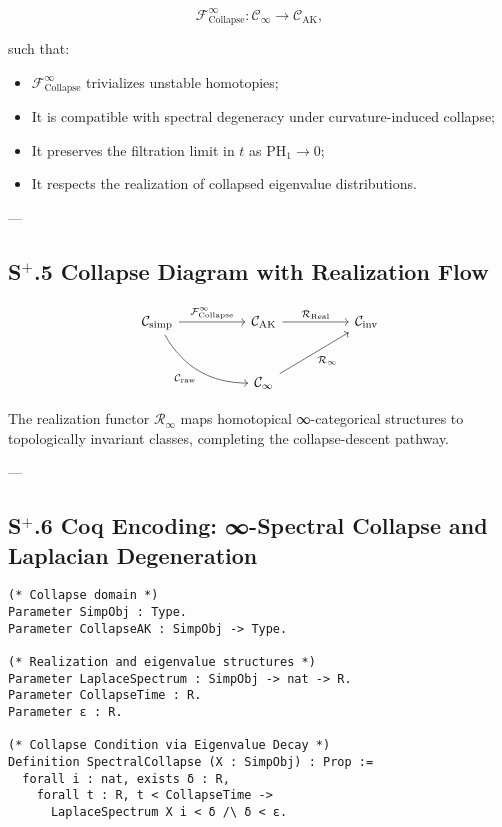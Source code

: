 \documentclass[11pt]{article}
\begin{document}
\[
\mathcal{F}_{\mathrm{Collapse}}^\infty : \mathcal{C}_\infty \to \mathcal{C}_{\mathrm{AK}},
\]

such that:

\begin{itemize}
    \item $\mathcal{F}_{\mathrm{Collapse}}^\infty$ trivializes unstable homotopies;
    \item It is compatible with spectral degeneracy under curvature-induced collapse;
    \item It preserves the filtration limit in \( t \) as \( \mathrm{PH}_1 \to 0 \);
    \item It respects the realization of collapsed eigenvalue distributions.
\end{itemize}

---

\subsection*{S$^{+}$.5 Collapse Diagram with Realization Flow}

\[
\begin{tikzcd}[column sep=huge, row sep=large]
\mathcal{C}_{\mathrm{simp}} 
  \arrow[r, "\mathcal{F}_{\mathrm{Collapse}}^\infty"] 
  \arrow[dr, bend right, swap, "\mathcal{C}_{\mathrm{raw}}"]
&
\mathcal{C}_{\mathrm{AK}} 
  \arrow[r, "\mathcal{R}_{\mathrm{Real}}"]
&
\mathcal{C}_{\mathrm{inv}} \\
& \mathcal{C}_\infty 
  \arrow[ur, swap, "\mathcal{R}_{\infty}"]
\end{tikzcd}
\]

The realization functor \( \mathcal{R}_{\infty} \) maps homotopical ∞-categorical structures to topologically invariant classes, completing the collapse-descent pathway.


---

\subsection*{S$^{+}$.6 Coq Encoding: ∞-Spectral Collapse and Laplacian Degeneration}

\begin{lstlisting}[language=Coq, caption={∞-Spectral Collapse with Laplacian Spectrum}]
(* Collapse domain *)
Parameter SimpObj : Type.
Parameter CollapseAK : SimpObj -> Type.

(* Realization and eigenvalue structures *)
Parameter LaplaceSpectrum : SimpObj -> nat -> R.
Parameter CollapseTime : R.
Parameter ε : R.

(* Collapse Condition via Eigenvalue Decay *)
Definition SpectralCollapse (X : SimpObj) : Prop :=
  forall i : nat, exists δ : R,
    forall t : R, t < CollapseTime ->
      LaplaceSpectrum X i < δ /\ δ < ε.
\end{lstlisting}
\end{document}
